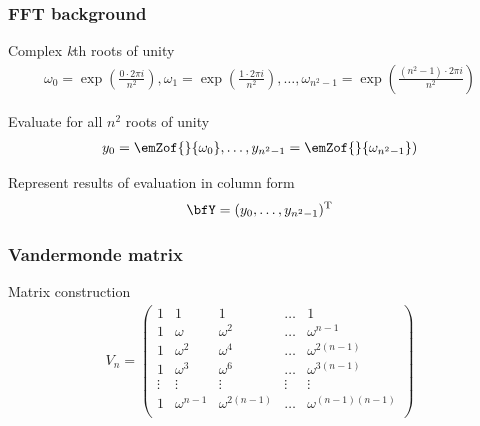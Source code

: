\documentclass{beamer}
\begin{document}
\begin{frame}
  \frametitle{FFT background}
  \begin{block}{Complex {\em k}th roots of unity}
  \begin{align*}
   \omega_0=\exp(\frac{0\cdot 2\pi i}{n^2}), \omega_1=\exp(\frac{1\cdot 2\pi i}{n^2}),\dots, \omega_{n^2-1}=\exp(\frac{(n^2-1)\cdot 2\pi i}{n^2})
  \end{align*}
  \end{block}

  \begin{block}{Evaluate  for all $n^2$ roots of unity}
  \begin{align*}
  y_0=\emZof{}{ \omega_0},\dots,y_{n^2-1}=\emZof{}{ \omega_{n^2-1}})
  \end{align*}
  \end{block}

  \begin{block}{Represent results of evaluation in column form}
  \begin{align*}
    \bfY = (y_0,\dots,y_{n^2-1})^{\text T}
  \end{align*}
  \end{block}
\end{frame}

\begin{frame}
  \frametitle{Vandermonde matrix}
  \begin{block}{Matrix construction}
  \begin{align*}
    V_{n} =
  \left(
  \begin{array}{rrrrr}
  1 & 1 & 1 & \dots & 1 \\
  1 & \omega & \omega^2 & \dots & \omega^{n-1} \\
  1 & \omega^2 & \omega^4 & \dots & \omega^{2(n-1)} \\
  1 & \omega^3 & \omega^6 & \dots & \omega^{3(n-1)} \\
  \vdots & \vdots & \vdots & \vdots & \vdots \\
  1 & \omega^{n-1} & \omega^{2(n-1)} & \dots & \omega^{(n-1)(n-1)} \\
  \end{array}
  \right)
  \end{align*}
  \end{block}
\end{frame}
\end{document}
